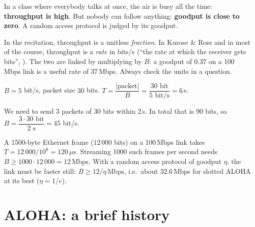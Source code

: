 \begin{intuition}
In a class where everybody talks at once, the air is busy all the time: \textbf{throughput is high}. But nobody can follow anything: \textbf{goodput is close to zero}.
A random access protocol is judged by its goodput.
\end{intuition}

\begin{pitfall}
In the recitation, throughput is a unitless \emph{fraction}. In Kurose \& Ross and in most of the course, throughput is a \emph{rate} in bits/s (``the rate at which the receiver gets bits'', ).
The two are linked by multiplying by $B$: a goodput of $0.37$ on a 100\,Mbps link is a useful rate of $37$\,Mbps. Always check the units in a question.
\end{pitfall}

\begin{example}
$B = 5$ bit/s, packet size $30$ bits. \;$T = \dfrac{|\text{packet}|}{B} = \dfrac{30\text{ bit}}{5\text{ bit/s}} = 6$\,s.
\end{example}

\begin{example}
We need to send 3 packets of 30 bits within 2\,s. In total that is $90$ bits, so $B = \dfrac{3\cdot30\text{ bit}}{2\text{ s}} = 45$ bit/s.
\end{example}

\begin{example}
A 1500-byte Ethernet frame ($12\,000$ bits) on a 100\,Mbps link takes $T = 12\,000/10^8 = 120\,\mu$s. Streaming 1000 such frames per second needs
$B \ge 1000\cdot12\,000 = 12$\,Mbps. With a random access protocol of goodput $\eta$, the link must be faster still: $B \ge 12/\eta$\,Mbps, i.e.\ about $32.6$\,Mbps for slotted ALOHA at its best ($\eta = 1/e$).
\end{example}

\section{ALOHA: a brief history}

